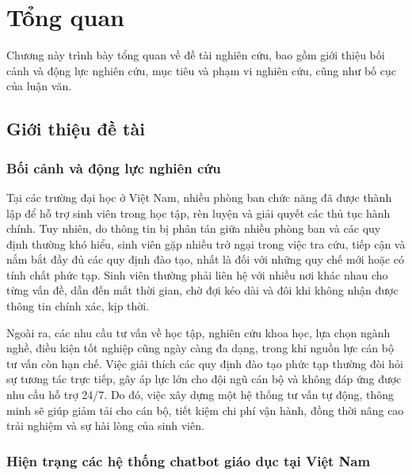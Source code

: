 \chapter{Tổng quan}
\label{chap:chapter1}

Chương này trình bày tổng quan về đề tài nghiên cứu, bao gồm giới thiệu bối cảnh và động lực nghiên cứu, mục tiêu và phạm vi nghiên cứu, cũng như bố cục của luận văn.

\section{Giới thiệu đề tài}
\label{sec:gioithieu}

\subsection{Bối cảnh và động lực nghiên cứu}
\label{subsec:boicanh}

Tại các trường đại học ở Việt Nam, nhiều phòng ban chức năng đã được thành lập để hỗ trợ sinh viên trong học tập, rèn luyện và giải quyết các thủ tục hành chính. Tuy nhiên, do thông tin bị phân tán giữa nhiều phòng ban và các quy định thường khó hiểu, sinh viên gặp nhiều trở ngại trong việc tra cứu, tiếp cận và nắm bắt đầy đủ các quy định đào tạo, nhất là đối với những quy chế mới hoặc có tính chất phức tạp. Sinh viên thường phải liên hệ với nhiều nơi khác nhau cho từng vấn đề, dẫn đến mất thời gian, chờ đợi kéo dài và đôi khi không nhận được thông tin chính xác, kịp thời.

Ngoài ra, các nhu cầu tư vấn về học tập, nghiên cứu khoa học, lựa chọn ngành nghề, điều kiện tốt nghiệp cũng ngày càng đa dạng, trong khi nguồn lực cán bộ tư vấn còn hạn chế. Việc giải thích các quy định đào tạo phức tạp thường đòi hỏi sự tương tác trực tiếp, gây áp lực lớn cho đội ngũ cán bộ và không đáp ứng được nhu cầu hỗ trợ 24/7. Do đó, việc xây dựng một hệ thống tư vấn tự động, thông minh sẽ giúp giảm tải cho cán bộ, tiết kiệm chi phí vận hành, đồng thời nâng cao trải nghiệm và sự hài lòng của sinh viên.

\subsection{Hiện trạng các hệ thống chatbot giáo dục tại Việt Nam}
\label{subsec:hientrang}

